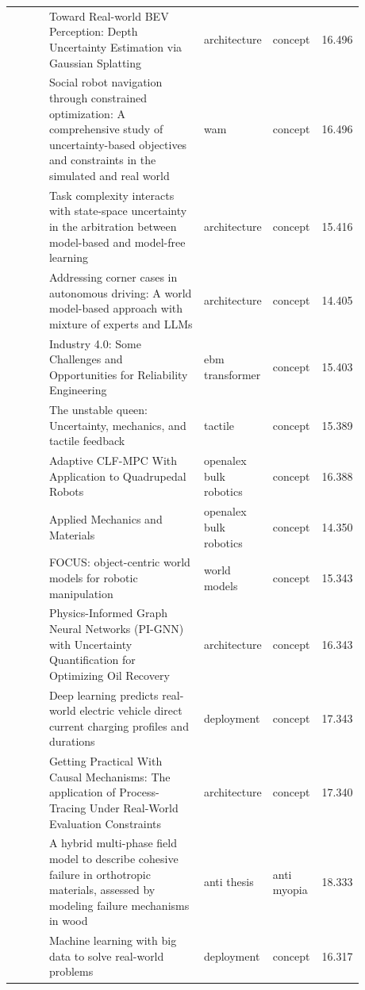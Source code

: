 \documentclass{article}
\begin{document}
\begin{center}
\begin{longtable}{p{0.12\linewidth}p{0.48\linewidth}p{0.14\linewidth}p{0.14\linewidth}r}
\citep{pool88_80} & Toward Real-world BEV Perception: Depth Uncertainty Estimation via Gaussian Splatting & architecture & concept & 16.496\\
\citep{pool88_81} & Social robot navigation through constrained optimization: A comprehensive study of uncertainty-based objectives and constraints in the simulated and real world & wam & concept & 16.496\\
\citep{pool88_82} & Task complexity interacts with state-space uncertainty in the arbitration between model-based and model-free learning & architecture & concept & 15.416\\
\citep{pool88_83} & Addressing corner cases in autonomous driving: A world model-based approach with mixture of experts and LLMs & architecture & concept & 14.405\\
\citep{pool88_84} & Industry 4.0: Some Challenges and Opportunities for Reliability Engineering & ebm transformer & concept & 15.403\\
\citep{pool88_85} & The unstable queen: Uncertainty, mechanics, and tactile feedback & tactile & concept & 15.389\\
\citep{pool88_86} & Adaptive CLF-MPC With Application to Quadrupedal Robots & openalex bulk robotics & concept & 16.388\\
\citep{pool88_87} & Applied Mechanics and Materials & openalex bulk robotics & concept & 14.350\\
\citep{pool88_88} & FOCUS: object-centric world models for robotic manipulation & world models & concept & 15.343\\
\citep{pool88_89} & Physics-Informed Graph Neural Networks (PI-GNN) with Uncertainty Quantification for Optimizing Oil Recovery & architecture & concept & 16.343\\
\citep{pool88_90} & Deep learning predicts real-world electric vehicle direct current charging profiles and durations & deployment & concept & 17.343\\
\citep{pool88_91} & Getting Practical With Causal Mechanisms: The application of Process-Tracing Under Real-World Evaluation Constraints & architecture & concept & 17.340\\
\citep{pool88_92} & A hybrid multi-phase field model to describe cohesive failure in orthotropic materials, assessed by modeling failure mechanisms in wood & anti thesis & anti myopia & 18.333\\
\citep{pool88_93} & Machine learning with big data to solve real-world problems & deployment & concept & 16.317\\

\end{longtable}
\end{center}
\end{document}
